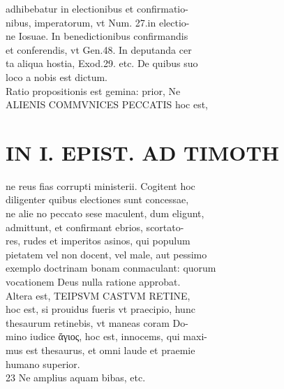 \documentclass{article}
\begin{document}
\begin{pages}
                adhibebatur in electionibus et confirmatio- \\
                nibus, imperatorum, vt Num. 27.in electio- \\
                ne Iosuae. In benedictionibus confirmandis \\
                et conferendis, vt Gen.48. In deputanda cer \\
                ta aliqua hostia, Exod.29. etc. De quibus suo \\
                loco a nobis est dictum. \\
                Ratio propositionis est gemina: prior, Ne \\
                ALIENIS COMMVNICES PECCATIS hoc est, \\
                
\section*{IN I. EPIST. AD TIMOTH \\
                }
ne reus fias corrupti ministerii. Cogitent hoc \\
                diligenter quibus electiones sunt concessae, \\
                ne alie no peccato sese maculent, dum eligunt, \\
                admittunt, et confirmant ebrios, scortato- \\
                res, rudes et imperitos asinos, qui populum \\
                pietatem vel non docent, vel male, aut pessimo \\
                exemplo doctrinam bonam conmaculant: quorum \\
                vocationem Deus nulla ratione approbat. \\
                Altera est, TEIPSVM CASTVM RETINE, \\
                hoc est, si prouidus fueris vt praecipio, hunc \\
                thesaurum retinebis, vt maneas coram Do- \\
                mino iudice ἅγιος, hoc est, innocems, qui maxi- \\
                mus est thesaurus, et omni laude et praemie \\
                humano superior. \\
                23 Ne amplius aquam bibas, etc. \\

\end{pages}
\end{document}
